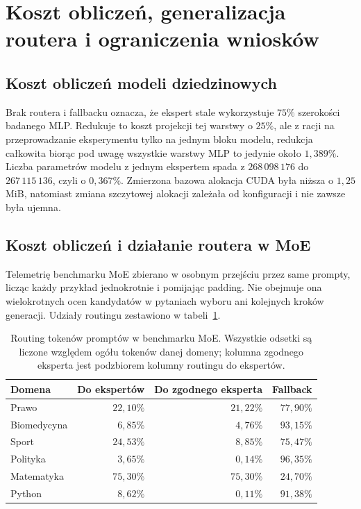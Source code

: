 \section{Koszt obliczeń, generalizacja routera i ograniczenia wniosków}
\label{sec:generalizacja_routera}
\subsection{Koszt obliczeń modeli dziedzinowych}
\label{subsec:koszt_ekspertow}
Brak routera i fallbacku oznacza, że ekspert stale wykorzystuje $75\%$ szerokości badanego MLP. Redukuje to koszt projekcji tej warstwy o $25\%$, ale z racji na przeprowadzanie eksperymentu tylko na jednym bloku modelu, redukcja całkowita biorąc pod uwagę wszystkie warstwy MLP to jedynie około $1{,}389\%$. Liczba parametrów modelu z jednym ekspertem spada z $268\,098\,176$ do $267\,115\,136$, czyli o $0{,}367\%$. Zmierzona bazowa alokacja CUDA była niższa o $1{,}25$ MiB, natomiast zmiana szczytowej alokacji zależała od konfiguracji i nie zawsze była ujemna. 

\subsection{Koszt obliczeń i działanie routera w MoE}
\label{subsec:koszt_router_moe}
Telemetrię benchmarku MoE zbierano w osobnym przejściu przez same prompty, licząc każdy przykład jednokrotnie i pomijając padding. Nie obejmuje ona wielokrotnych ocen kandydatów w pytaniach wyboru ani kolejnych kroków generacji. Udziały routingu zestawiono w tabeli~\ref{tab:walidacja_routing}.

\begin{table}[htbp]
\centering
\small
\begin{tabular}{lrrr}
\toprule
Domena & Do ekspertów & Do zgodnego eksperta & Fallback \\
\midrule
Prawo & $22{,}10\%$ & $21{,}22\%$ & $77{,}90\%$ \\
Biomedycyna & $6{,}85\%$ & $4{,}76\%$ & $93{,}15\%$ \\
Sport & $24{,}53\%$ & $8{,}85\%$ & $75{,}47\%$ \\
Polityka & $3{,}65\%$ & $0{,}14\%$ & $96{,}35\%$ \\
Matematyka & $75{,}30\%$ & $75{,}30\%$ & $24{,}70\%$ \\
Python & $8{,}62\%$ & $0{,}11\%$ & $91{,}38\%$ \\
\bottomrule
\end{tabular}
\caption{Routing tokenów promptów w benchmarku MoE. Wszystkie odsetki są liczone względem ogółu tokenów danej domeny; kolumna zgodnego eksperta jest podzbiorem kolumny routingu do ekspertów.}
\label{tab:walidacja_routing}
\end{table}

